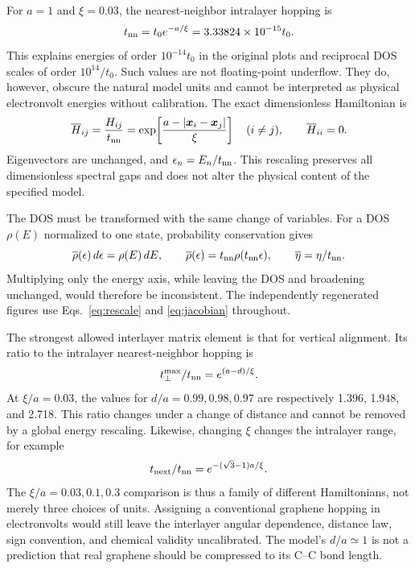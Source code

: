 \documentclass[aps,prl,10pt,onecolumn,superscriptaddress,longbibliography]{revtex4-2}
\begin{document}
For $a=1$ and $\xi=0.03$, the nearest-neighbor intralayer hopping is
\begin{equation}
 t_{\rm nn}=t_0e^{-a/\xi}
            =3.33824\times10^{-15}t_0.
 \label{eq:small}
\end{equation}
This explains energies of order $10^{-14}t_0$ in the original plots and reciprocal DOS scales of order $10^{14}/t_0$. Such values are not floating-point underflow. They do, however, obscure the natural model units and cannot be interpreted as physical electronvolt energies without calibration. The exact dimensionless Hamiltonian is
\begin{equation}
 \overline H_{ij}=\frac{H_{ij}}{t_{\rm nn}}
 =\exp\!\left[\frac{a-|\bm x_i-\bm x_j|}{\xi}\right]\quad(i\ne j),
 \qquad \overline H_{ii}=0.
 \label{eq:rescale}
\end{equation}
Eigenvectors are unchanged, and $\epsilon_n=E_n/t_{\rm nn}$. This rescaling preserves all dimensionless spectral gaps and does not alter the physical content of the specified model.

The DOS must be transformed with the same change of variables. For a DOS $\rho(E)$ normalized to one state, probability conservation gives
\begin{equation}
 \overline\rho(\epsilon)\,d\epsilon=\rho(E)\,dE,
 \qquad \overline\rho(\epsilon)=t_{\rm nn}\rho(t_{\rm nn}\epsilon),
 \qquad \overline\eta=\eta/t_{\rm nn}.
 \label{eq:jacobian}
\end{equation}
Multiplying only the energy axis, while leaving the DOS and broadening unchanged, would therefore be inconsistent. The independently regenerated figures use Eqs.~\eqref{eq:rescale} and \eqref{eq:jacobian} throughout.

The strongest allowed interlayer matrix element is that for vertical alignment. Its ratio to the intralayer nearest-neighbor hopping is
\begin{equation}
 t_\perp^{\max}/t_{\rm nn}=e^{(a-d)/\xi}.
\end{equation}
At $\xi/a=0.03$, the values for $d/a=0.99,0.98,0.97$ are respectively 1.396, 1.948, and 2.718. This ratio changes under a change of distance and cannot be removed by a global energy rescaling. Likewise, changing $\xi$ changes the intralayer range, for example
\begin{equation}
 t_{\rm next}/t_{\rm nn}=e^{-(\sqrt3-1)a/\xi}.
\end{equation}
The $\xi/a=0.03,0.1,0.3$ comparison is thus a family of different Hamiltonians, not merely three choices of units. Assigning a conventional graphene hopping in electronvolts would still leave the interlayer angular dependence, distance law, sign convention, and chemical validity uncalibrated. The model's $d/a\simeq1$ is not a prediction that real graphene should be compressed to its C--C bond length.
\end{document}
